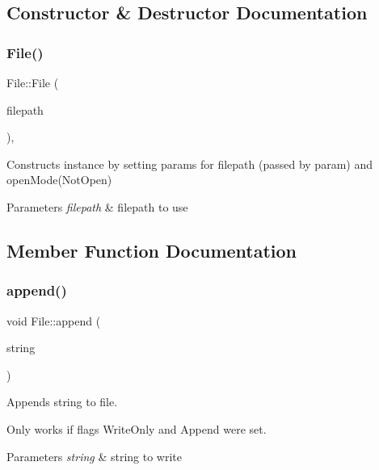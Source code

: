 \subsection{Constructor \& Destructor Documentation}
\mbox{\label{class_file_acdd8c37d2cac9e9e9a43b34923aa0c97}} 
\subsubsection{\texorpdfstring{File()}{File()}}
{\footnotesize\ttfamily File\+::\+File (\begin{DoxyParamCaption}\item[{const \mbox{\hyperlink{class_a_string}{A\+String}} \&}]{filepath }\end{DoxyParamCaption})\hspace{0.3cm}{\ttfamily [explicit]}, {\ttfamily [noexcept]}}



Constructs instance by setting params for filepath (passed by param) and open\+Mode(\+Not\+Open) 


\begin{DoxyParams}{Parameters}
{\em filepath} & filepath to use \\
\hline
\end{DoxyParams}


\subsection{Member Function Documentation}
\mbox{\label{class_file_a7598c356f21d695e7e69fc523500588a}} 
\subsubsection{\texorpdfstring{append()}{append()}}
{\footnotesize\ttfamily void File\+::append (\begin{DoxyParamCaption}\item[{const \mbox{\hyperlink{class_a_string}{A\+String}} \&}]{string }\end{DoxyParamCaption})}



Appends string to file. 

Only works if flags Write\+Only and Append were set. 
\begin{DoxyParams}{Parameters}
{\em string} & string to write \\
\hline
\end{DoxyParams}
\mbox{\label{class_file_a6f433c3bbc327cf15217d2f3c4cd043d}} 
